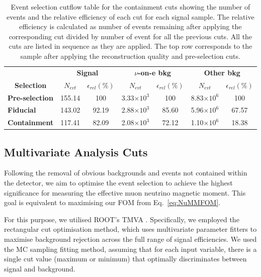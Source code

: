\begin{table}[!hb]
\centering
\caption[Event selection cutflow table for the containment cuts]{Event selection cutflow table for the containment cuts showing the number of events and the relative efficiency of each cut for each signal sample. The relative efficiency is calculated as number of events remaining after applying the corresponding cut divided by number of event for all the previous cuts. All the cuts are listed in sequence as they are applied. The top row corresponds to the sample after applying the reconstruction quality and pre-selection cuts.}
\begin{tabular}{|l|cc|cc|cc|}\hline
\multicolumn{1}{|c|}{} & \multicolumn{2}{c|}{\textbf{Signal}} & \multicolumn{2}{c|}{\textbf{$\nu$-on-e bkg}} & \multicolumn{2}{c|}{\textbf{Other bkg}} \\
\multicolumn{1}{|c|}{\multirow{-2}{*}{\textbf{Selection}}} & \textbf{$N_{evt}$} & \textbf{$\epsilon_{rel}\left(\%\right)$} & \textbf{$N_{evt}$} & \textbf{$\epsilon_{rel}\left(\%\right)$}  & \textbf{$N_{evt}$} & \textbf{$\epsilon_{rel}\left(\%\right)$}\\\hline
\textbf{Pre-selection} & 155.14 & 100 & 3.33$\times 10^3$ & 100 & 8.83$\times 10^6$ & 100\\
\textbf{Fiducial} & 143.02 & 92.19 & 2.88$\times 10^3$ & 85.60 & 5.96$\times 10^6$ & 67.57\\
\textbf{Containment} & 117.41 & 82.09 & 2.08$\times 10^3$ & 72.12 & 1.10$\times 10^6$ & 18.38\\\hline
\end{tabular}
\label{tab:CutflowTableFiducialContainmnet}
\end{table}

\subsection{Multivariate Analysis Cuts}\label{sec:NuMMEventSelTMVA}
Following the removal of obvious backgrounds and events not contained within the detector, we aim to optimise the event selection to achieve the highest significance for measuring the effective muon neutrino magnetic moment. This goal is equivalent to maximising our \gls{FOM} from Eq.~\ref{eq:NuMMFOM}.

For this purpose, we utilised ROOT's \cite{ROOT} \gls{TMVA} \cite{TMVA}. Specifically, we employed the rectangular cut optimisation method, which uses multivariate parameter fitters to maximise background rejection across the full range of signal efficiencies. We used the \gls{MC} sampling fitting method, assuming that for each input variable, there is a single cut value (maximum or minimum) that optimally discriminates between signal and background.


